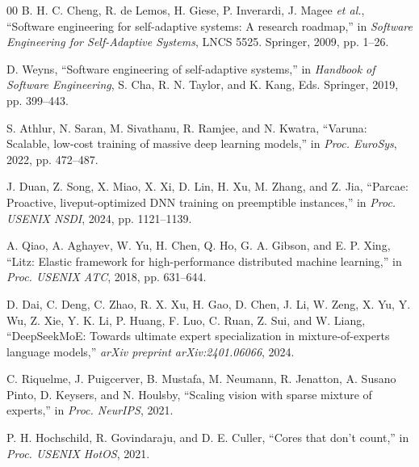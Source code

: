 \documentclass[10pt,conference]{IEEEtran}
\begin{document}
\begin{thebibliography}{00}
 B. H. C. Cheng, R. de Lemos, H. Giese, P. Inverardi, J. Magee \textit{et al.}, ``Software engineering for self-adaptive systems: A research roadmap,'' in \textit{Software Engineering for Self-Adaptive Systems}, LNCS 5525. Springer, 2009, pp. 1--26.

 D. Weyns, ``Software engineering of self-adaptive systems,'' in \textit{Handbook of Software Engineering}, S. Cha, R. N. Taylor, and K. Kang, Eds. Springer, 2019, pp. 399--443.

 S. Athlur, N. Saran, M. Sivathanu, R. Ramjee, and N. Kwatra, ``Varuna: Scalable, low-cost training of massive deep learning models,'' in \textit{Proc. EuroSys}, 2022, pp. 472--487.

 J. Duan, Z. Song, X. Miao, X. Xi, D. Lin, H. Xu, M. Zhang, and Z. Jia, ``Parcae: Proactive, liveput-optimized DNN training on preemptible instances,'' in \textit{Proc. USENIX NSDI}, 2024, pp. 1121--1139.

 A. Qiao, A. Aghayev, W. Yu, H. Chen, Q. Ho, G. A. Gibson, and E. P. Xing, ``Litz: Elastic framework for high-performance distributed machine learning,'' in \textit{Proc. USENIX ATC}, 2018, pp. 631--644.

 D. Dai, C. Deng, C. Zhao, R. X. Xu, H. Gao, D. Chen, J. Li, W. Zeng, X. Yu, Y. Wu, Z. Xie, Y. K. Li, P. Huang, F. Luo, C. Ruan, Z. Sui, and W. Liang, ``DeepSeekMoE: Towards ultimate expert specialization in mixture-of-experts language models,'' \textit{arXiv preprint arXiv:2401.06066}, 2024.

 C. Riquelme, J. Puigcerver, B. Mustafa, M. Neumann, R. Jenatton, A. Susano Pinto, D. Keysers, and N. Houlsby, ``Scaling vision with sparse mixture of experts,'' in \textit{Proc. NeurIPS}, 2021.

 P. H. Hochschild, R. Govindaraju, and D. E. Culler, ``Cores that don't count,'' in \textit{Proc. USENIX HotOS}, 2021.

\end{thebibliography}
\end{document}
